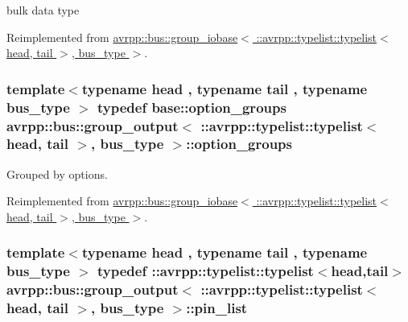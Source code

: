 bulk data type 



Reimplemented from \hyperlink{structavrpp_1_1bus_1_1group__iobase_3_01_1_1avrpp_1_1typelist_1_1typelist_3_01head_00_01tail_01_4_00_01bus__type_01_4_a143651b666f2d9a6e9f236b04b6dbb52}{avrpp::bus::group\_\-iobase$<$ ::avrpp::typelist::typelist$<$ head, tail $>$, bus\_\-type $>$}.

\hypertarget{structavrpp_1_1bus_1_1group__output_3_01_1_1avrpp_1_1typelist_1_1typelist_3_01head_00_01tail_01_4_00_01bus__type_01_4_acde54fbde4fa72d86cdd16a22955be53}{
\subsubsection[{option\_\-groups}]{\setlength{\rightskip}{0pt plus 5cm}template$<$typename head , typename tail , typename bus\_\-type $>$ typedef base::option\_\-groups avrpp::bus::group\_\-output$<$ ::{\bf avrpp::typelist::typelist}$<$ head, tail $>$, bus\_\-type $>$::{\bf option\_\-groups}}}
\label{structavrpp_1_1bus_1_1group__output_3_01_1_1avrpp_1_1typelist_1_1typelist_3_01head_00_01tail_01_4_00_01bus__type_01_4_acde54fbde4fa72d86cdd16a22955be53}


Grouped by options. 



Reimplemented from \hyperlink{structavrpp_1_1bus_1_1group__iobase_3_01_1_1avrpp_1_1typelist_1_1typelist_3_01head_00_01tail_01_4_00_01bus__type_01_4_ac3e03bebeadefc2d2c4ad6a0b6b49899}{avrpp::bus::group\_\-iobase$<$ ::avrpp::typelist::typelist$<$ head, tail $>$, bus\_\-type $>$}.

\hypertarget{structavrpp_1_1bus_1_1group__output_3_01_1_1avrpp_1_1typelist_1_1typelist_3_01head_00_01tail_01_4_00_01bus__type_01_4_a8f38159613b1738f164276c3f028f87c}{
\subsubsection[{pin\_\-list}]{\setlength{\rightskip}{0pt plus 5cm}template$<$typename head , typename tail , typename bus\_\-type $>$ typedef ::{\bf avrpp::typelist::typelist}$<$head,tail$>$ avrpp::bus::group\_\-output$<$ ::{\bf avrpp::typelist::typelist}$<$ head, tail $>$, bus\_\-type $>$::{\bf pin\_\-list}}}
\label{structavrpp_1_1bus_1_1group__output_3_01_1_1avrpp_1_1typelist_1_1typelist_3_01head_00_01tail_01_4_00_01bus__type_01_4_a8f38159613b1738f164276c3f028f87c}


